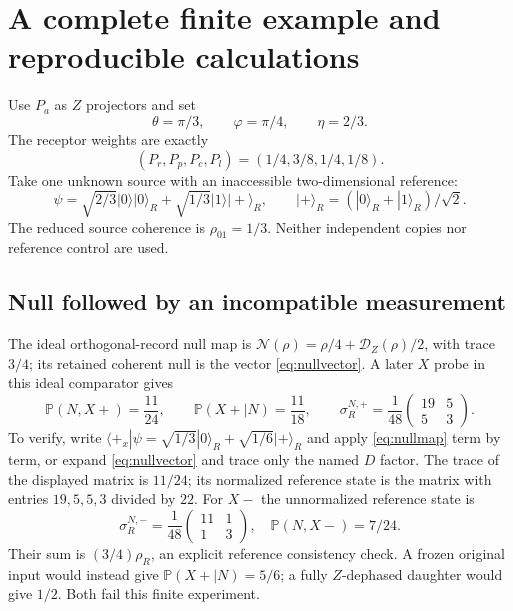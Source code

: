 \documentclass[11pt]{article}
\theoremstyle{definition}\newtheorem{assumption}[theorem]{Constitutive assumption}
\theoremstyle{remark}\newtheorem{remark}[theorem]{Remark}
\newcommand{\ket}[1]{|#1\rangle}\newcommand{\bra}[1]{\langle#1|}
\newcommand{\Prb}{\mathbb P}\newcommand{\TV}{d_{\rm TV}}
\begin{document}
\section{A complete finite example and reproducible calculations}
\label{sec:example}
Use $P_a$ as $Z$ projectors and set
\[
 \theta=\pi/3,\qquad\varphi=\pi/4,\qquad\eta=2/3.
\]
The receptor weights are exactly
\begin{equation}\label{eq:exampleweights}
 (P_r,P_p,P_c,P_l)=(1/4,3/8,1/4,1/8).
\end{equation}
Take one unknown source with an inaccessible two-dimensional reference:
\begin{equation}\label{eq:inputexample}
 \psi=\sqrt{2/3}\ket0\ket0_R+
                       \sqrt{1/3}\ket1\ket+_R,\qquad
 \ket+_R=(\ket0_R+\ket1_R)/\sqrt2.
\end{equation}
The reduced source coherence is $\rho_{01}=1/3$. Neither independent copies nor reference control are used.

\subsection{Null followed by an incompatible measurement}
The ideal orthogonal-record null map is $\mathcal N(\rho)=\rho/4+\mathcal D_Z(\rho)/2$, with trace $3/4$; its retained coherent null is the vector \eqref{eq:nullvector}. A later $X$ probe in this ideal comparator gives
\begin{equation}\label{eq:nullnumbers}
 \Prb(N,X+)=\frac{11}{24},\qquad
 \Prb(X+\mid N)=\frac{11}{18},\qquad
 \sigma_R^{N,+}=\frac1{48}
               \begin{pmatrix}19&5\\5&3\end{pmatrix}.
\end{equation}
To verify, write $\bra{+_x}\psi=\sqrt{1/3}\ket0_R+\sqrt{1/6}\ket+_R$ and apply \eqref{eq:nullmap} term by term, or expand \eqref{eq:nullvector} and trace only the named $D$ factor. The trace of the displayed matrix is $11/24$; its normalized reference state is the matrix with entries $19,5,5,3$ divided by $22$. For $X-$ the unnormalized reference state is
\[
 \sigma_R^{N,-}=\frac1{48}\begin{pmatrix}11&1\\1&3\end{pmatrix},
 \quad\Prb(N,X-)=7/24.
\]
Their sum is $(3/4)\rho_R$, an explicit reference consistency check. A frozen original input would instead give $\Prb(X+\mid N)=5/6$; a fully $Z$-dephased daughter would give $1/2$. Both fail this finite experiment.
\end{document}
